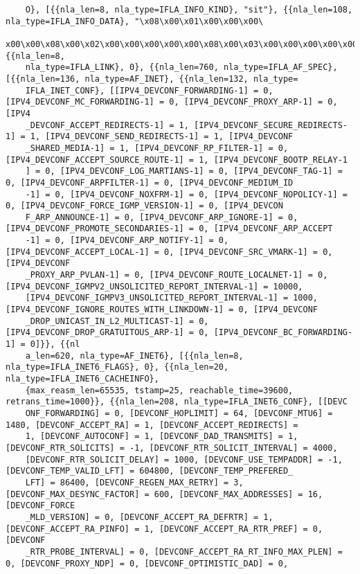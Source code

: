 \documentclass[pdf, unicode, 12pt, a4paper,oneside,fleqn]{article}
\begin{document}
{\begin{verbatim}
    O}, [{{nla_len=8, nla_type=IFLA_INFO_KIND}, "sit"}, {{nla_len=108, nla_type=IFLA_INFO_DATA}, "\x08\x00\x01\x00\x00\x00\
    x00\x00\x08\x00\x02\x00\x00\x00\x00\x00\x08\x00\x03\x00\x00\x00\x00\x00\x05\x00\x04\x00\x40\x00\x00\x00"...}]}, {{nla_len=8,
    nla_type=IFLA_LINK}, 0}, {{nla_len=760, nla_type=IFLA_AF_SPEC}, [{{nla_len=136, nla_type=AF_INET}, {{nla_len=132, nla_type=
    IFLA_INET_CONF}, [[IPV4_DEVCONF_FORWARDING-1] = 0, [IPV4_DEVCONF_MC_FORWARDING-1] = 0, [IPV4_DEVCONF_PROXY_ARP-1] = 0, [IPV4
    _DEVCONF_ACCEPT_REDIRECTS-1] = 1, [IPV4_DEVCONF_SECURE_REDIRECTS-1] = 1, [IPV4_DEVCONF_SEND_REDIRECTS-1] = 1, [IPV4_DEVCONF
    _SHARED_MEDIA-1] = 1, [IPV4_DEVCONF_RP_FILTER-1] = 0, [IPV4_DEVCONF_ACCEPT_SOURCE_ROUTE-1] = 1, [IPV4_DEVCONF_BOOTP_RELAY-1
    ] = 0, [IPV4_DEVCONF_LOG_MARTIANS-1] = 0, [IPV4_DEVCONF_TAG-1] = 0, [IPV4_DEVCONF_ARPFILTER-1] = 0, [IPV4_DEVCONF_MEDIUM_ID
    -1] = 0, [IPV4_DEVCONF_NOXFRM-1] = 0, [IPV4_DEVCONF_NOPOLICY-1] = 0, [IPV4_DEVCONF_FORCE_IGMP_VERSION-1] = 0, [IPV4_DEVCON
    F_ARP_ANNOUNCE-1] = 0, [IPV4_DEVCONF_ARP_IGNORE-1] = 0, [IPV4_DEVCONF_PROMOTE_SECONDARIES-1] = 0, [IPV4_DEVCONF_ARP_ACCEPT
    -1] = 0, [IPV4_DEVCONF_ARP_NOTIFY-1] = 0, [IPV4_DEVCONF_ACCEPT_LOCAL-1] = 0, [IPV4_DEVCONF_SRC_VMARK-1] = 0, [IPV4_DEVCONF
    _PROXY_ARP_PVLAN-1] = 0, [IPV4_DEVCONF_ROUTE_LOCALNET-1] = 0, [IPV4_DEVCONF_IGMPV2_UNSOLICITED_REPORT_INTERVAL-1] = 10000, 
    [IPV4_DEVCONF_IGMPV3_UNSOLICITED_REPORT_INTERVAL-1] = 1000, [IPV4_DEVCONF_IGNORE_ROUTES_WITH_LINKDOWN-1] = 0, [IPV4_DEVCONF
    _DROP_UNICAST_IN_L2_MULTICAST-1] = 0, [IPV4_DEVCONF_DROP_GRATUITOUS_ARP-1] = 0, [IPV4_DEVCONF_BC_FORWARDING-1] = 0]}}, {{nl
    a_len=620, nla_type=AF_INET6}, [{{nla_len=8, nla_type=IFLA_INET6_FLAGS}, 0}, {{nla_len=20, nla_type=IFLA_INET6_CACHEINFO}, 
    {max_reasm_len=65535, tstamp=25, reachable_time=39600, retrans_time=1000}}, {{nla_len=208, nla_type=IFLA_INET6_CONF}, [[DEVC
    ONF_FORWARDING] = 0, [DEVCONF_HOPLIMIT] = 64, [DEVCONF_MTU6] = 1480, [DEVCONF_ACCEPT_RA] = 1, [DEVCONF_ACCEPT_REDIRECTS] = 
    1, [DEVCONF_AUTOCONF] = 1, [DEVCONF_DAD_TRANSMITS] = 1, [DEVCONF_RTR_SOLICITS] = -1, [DEVCONF_RTR_SOLICIT_INTERVAL] = 4000, 
    [DEVCONF_RTR_SOLICIT_DELAY] = 1000, [DEVCONF_USE_TEMPADDR] = -1, [DEVCONF_TEMP_VALID_LFT] = 604800, [DEVCONF_TEMP_PREFERED_
    LFT] = 86400, [DEVCONF_REGEN_MAX_RETRY] = 3, [DEVCONF_MAX_DESYNC_FACTOR] = 600, [DEVCONF_MAX_ADDRESSES] = 16, [DEVCONF_FORCE
    _MLD_VERSION] = 0, [DEVCONF_ACCEPT_RA_DEFRTR] = 1, [DEVCONF_ACCEPT_RA_PINFO] = 1, [DEVCONF_ACCEPT_RA_RTR_PREF] = 0, [DEVCONF
    _RTR_PROBE_INTERVAL] = 0, [DEVCONF_ACCEPT_RA_RT_INFO_MAX_PLEN] = 0, [DEVCONF_PROXY_NDP] = 0, [DEVCONF_OPTIMISTIC_DAD] = 0, 

\end{verbatim}}
\end{document}
